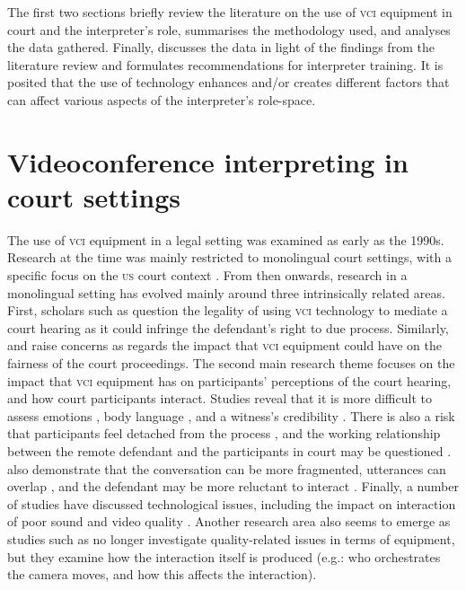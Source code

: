 \documentclass[output=paper]{langsci/langscibook}
\begin{document}
The first two sections briefly review the literature on the use of \textsc{vci} equipment in court and the interpreter’s role,  summarises the methodology used, and  analyses the data gathered. Finally,  discusses the data in light of the findings from the literature review and formulates recommendations for interpreter training. It is posited that the use of technology enhances and/or creates different factors that can affect various aspects of the interpreter’s role-space.  

\section{Videoconference interpreting in court settings}
\label{sec:devaux:2}
The use of \textsc{vci} equipment in a legal setting was examined as early as the 1990s. Research at the time was mainly restricted to monolingual court settings, with a specific focus on the \textsc{us} court context \citep{Radburn-Remfry1994,Thaxton1993}. From then onwards, research in a monolingual setting has evolved mainly around three intrinsically related areas. First, scholars such as \citet{Johnson2006} question the legality of using \textsc{vci} technology to mediate a court hearing as it could infringe the defendant’s right to due process. Similarly, \citet{Radburn-Remfry1994} and \citet{Thaxton1993} raise concerns as regards the impact that \textsc{vci} equipment could have on the fairness of the court proceedings. The second main research theme focuses on the impact that \textsc{vci} equipment has on participants’ perceptions of the court hearing, and how court participants interact. Studies reveal that it is more difficult to assess emotions \citep{Radburn-Remfry1994}, body language \citep{Fullwood2008}, and a witness’s credibility \citep{Roth2000}. There is also a risk that participants feel detached from the process \citep{McKay2016}, and the working relationship between the remote defendant and the participants in court may be questioned \citep{Hodges2008}. \citet{Verdier2011} also demonstrate that the conversation can be more fragmented, utterances can overlap \citep{Licoppe2015}, and the defendant may be more reluctant to interact \citep{Licoppe2014}. Finally, a number of studies have discussed technological issues, including the impact on interaction of poor sound and video quality \citep{Haas2006, Plotnikoff2000}. Another research area also seems to emerge as studies such as \citet{Licoppe2013} no longer investigate quality-related issues in terms of equipment, but they examine how the interaction itself is produced (e.g.: who orchestrates the camera moves, and how this affects the interaction). 
\end{document}
